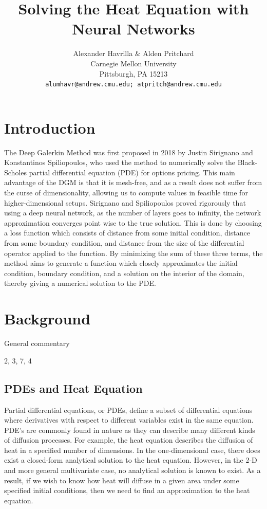 \documentclass{article}
\title{Solving the Heat Equation with Neural Networks}
\author{
  Alexander Havrilla \& Alden Pritchard\\
  Carnegie Mellon University\\
  Pittsburgh, PA 15213 \\
  \texttt{alumhavr@andrew.cmu.edu; atpritch@andrew.cmu.edu} \\
}
\begin{document}

\maketitle

\section{Introduction}
The Deep Galerkin Method was first proposed in 2018 by Justin Sirignano and Konstantinos Spiliopoulos, who used the method to numerically solve the Black-Scholes partial differential equation (PDE) for options pricing. This main advantage of the DGM is that it is mesh-free, and as a result does not suffer from the curse of dimensionality, allowing us to compute values in feasible time for higher-dimensional setups. Sirignano and Spiliopoulos proved rigorously that using a deep neural network, as the number of layers goes to infinity, the network approximation converges point wise to the true solution. This is done by choosing a loss function which consists of distance from some initial condition, distance from some boundary condition, and distance from the size of the differential operator applied to the function. By minimizing the sum of these three terms, the method aims to generate a function which closely approximates the initial condition, boundary condition, and a solution on the interior of the domain, thereby giving a numerical solution to the PDE.

\section{Background}

General commentary

2, 3, 7, 4

\subsection{PDEs and Heat Equation}

Partial differential equations, or PDEs, define a subset of differential equations where derivatives with respect to different variables exist in the same equation. PDE's are commonly found in nature as they can describe many different kinds of diffusion processes. For example, the heat equation describes the diffusion of heat in a specified number of dimensions. In the one-dimensional case, there does exist a closed-form analytical solution to the heat equation. However, in the 2-D and more general multivariate case, no analytical solution is known to exist. As a result, if we wish to know how heat will diffuse in a given area under some specified initial conditions, then we need to find an approximation to the heat equation.
\end{document}
